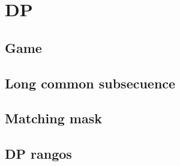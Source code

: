\section{DP}
\subsection{Game}


\subsection{Long common subsecuence}


\subsection{Matching mask}


\subsection{DP rangos}


\newpage
